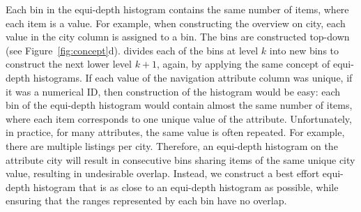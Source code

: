  
Each bin in the equi-depth histogram
contains the same number of items,
where each item is a value.
For example,
when constructing the overview
on city,
each value in the city column
is assigned to a bin.
The bins are constructed top-down
(see Figure~\ref{fig:concept}d). \noah divides
each of the bins at level $k$ into new bins
to construct the next lower level $k+1$, again,
by applying the same concept of equi-depth histograms.
If each value of the navigation attribute
column was unique, \eg if it was a numerical ID,
then construction of the histogram would be easy:
each bin of the equi-depth histogram
would contain almost the same number of items,
where each item corresponds to one unique value of
the attribute.
Unfortunately, in practice, for many attributes,
the same value is often repeated.
For example,
there are multiple listings
per city.
Therefore,
an equi-depth histogram
on the
attribute city
will result in consecutive bins
sharing items of
the same unique city value,
resulting in undesirable overlap.
Instead,
we construct a best effort
equi-depth
histogram that is as close to an equi-depth
histogram as possible, while ensuring
that the ranges represented by each bin have no overlap.


